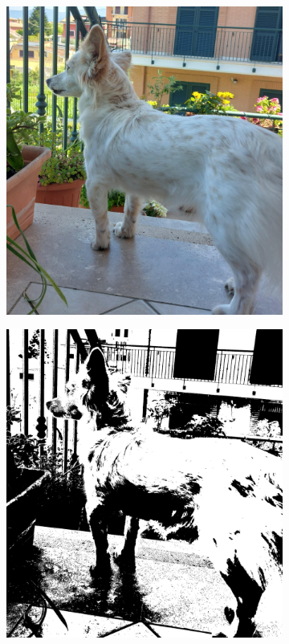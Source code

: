 \begin{figure}[ht]
	\centering
	\begin{subfigure}{0.4\linewidth}
		\includegraphics[width=\linewidth]{Figures/example.jpeg}
	\end{subfigure}
	\hspace{2cm}
	\begin{subfigure}{0.4\linewidth}
		\includegraphics[width=\linewidth]{Figures/example_bw.jpeg}

\end{subfigure}
\end{figure}
